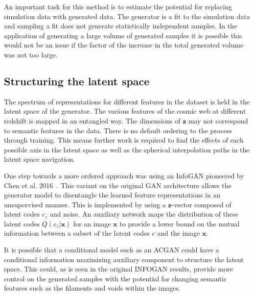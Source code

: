 \documentclass[twocolumn]{article}
\numberwithin{equation}{section}
\begin{document}
An important task for this method is to estimate the potential for replacing simulation data with generated data. The 
generator is a fit to the simulation data and sampling a fit does not generate statistically independent samples. In the 
application of generating a large volume of generated samples it is possible this would not be an issue if the factor of 
the increase in the total generated volume was not too large.


\subsection{Structuring the latent space}

The spectrum of representations for different features in the dataset is held in the latent space of the generator. The 
various features of the cosmic web at different redshift is mapped in an entangled way. The dimensions of $\mathbf{z}$ may 
not correspond to semantic features in the data. There is no default ordering to the process through training. This means 
further work is required to find the effects of each possible axis in the latent space as well as the spherical interpolation paths in the latent space navigation. 

One step towards a more ordered approach was using an InfoGAN pioneered by Chen et al. 2016~\cite{infogan}. This variant on the original GAN 
architecture allows the generator model to disentangle the learned feature representations in an unsupervised manner. This 
is implemented by using a $\mathbf{z}$-vector composed of latent codes $c_z$ and noise. An auxiliary network maps the 
distribution of these latent codes $Q(c_z|\mathbf{x})$ for an image $\mathbf{x}$ to provide a lower bound on the mutual 
information between a subset of the latent codes $c$ and the image $\mathbf{x}$.

It is possible that a conditional model such as an ACGAN could have a conditional information maximizing auxiliary component
to structure the latent space. This could, as is seen in the original INFOGAN results, provide more control on the generated
samples with the potential for changing semantic features such as the filaments and voids within the images.
\end{document}
